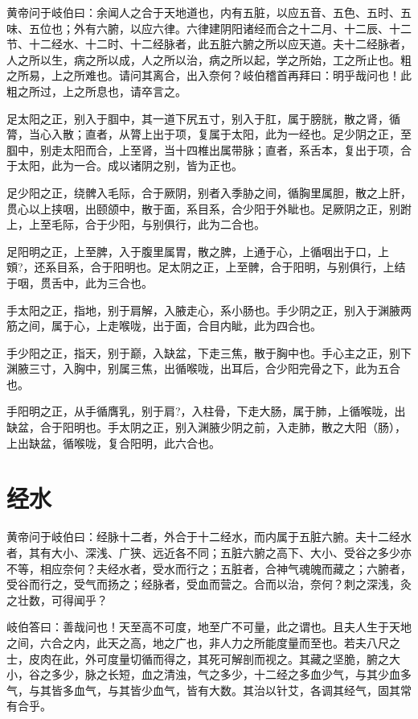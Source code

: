 \documentclass[a4paper,12pt,UTF8,twoside]{ctexbook}
\begin{document}
	黄帝问于岐伯曰：余闻人之合于天地道也，内有五脏，以应五音、五色、五时、五味、五位也；外有六腑，以应六律。六律建阴阳诸经而合之十二月、十二辰、十二节、十二经水、十二时、十二经脉者，此五脏六腑之所以应天道。夫十二经脉者，人之所以生，病之所以成，人之所以治，病之所以起，学之所始，工之所止也。粗之所易，上之所难也。请问其离合，出入奈何？岐伯稽首再拜曰：明乎哉问也！此粗之所过，上之所息也，请卒言之。
	
	足太阳之正，别入于腘中，其一道下尻五寸，别入于肛，属于膀胱，散之肾，循膂，当心入散；直者，从膂上出于项，复属于太阳，此为一经也。足少阴之正，至腘中，别走太阳而合，上至肾，当十四椎出属带脉；直者，系舌本，复出于项，合于太阳，此为一合。成以诸阴之别，皆为正也。
	
	足少阳之正，绕髀入毛际，合于厥阴，别者入季胁之间，循胸里属胆，散之上肝，贯心以上挟咽，出颐颌中，散于面，系目系，合少阳于外眦也。足厥阴之正，别跗上，上至毛际，合于少阳，与别俱行，此为二合也。
	
	足阳明之正，上至脾，入于腹里属胃，散之脾，上通于心，上循咽出于口，上頞?，还系目系，合于阳明也。足太阴之正，上至髀，合于阳明，与别俱行，上结于咽，贯舌中，此为三合也。
	
	手太阳之正，指地，别于肩解，入腋走心，系小肠也。手少阴之正，别入于渊腋两筋之间，属于心，上走喉咙，出于面，合目内眦，此为四合也。
	
	手少阳之正，指天，别于巅，入缺盆，下走三焦，散于胸中也。手心主之正，别下渊腋三寸，入胸中，别属三焦，出循喉咙，出耳后，合少阳完骨之下，此为五合也。
	
	手阳明之正，从手循膺乳，别于肩?，入柱骨，下走大肠，属于肺，上循喉咙，出缺盆，合于阳明也。手太阴之正，别入渊腋少阴之前，入走肺，散之大阳（肠），上出缺盆，循喉咙，复合阳明，此六合也。
	\chapter{经水}
	
	黄帝问于岐伯曰：经脉十二者，外合于十二经水，而内属于五脏六腑。夫十二经水者，其有大小、深浅、广狭、远近各不同；五脏六腑之高下、大小、受谷之多少亦不等，相应奈何？夫经水者，受水而行之；五脏者，合神气魂魄而藏之；六腑者，受谷而行之，受气而扬之；经脉者，受血而营之。合而以治，奈何？刺之深浅，灸之壮数，可得闻乎？
	
	岐伯答曰：善哉问也！天至高不可度，地至广不可量，此之谓也。且夫人生于天地之间，六合之内，此天之高，地之广也，非人力之所能度量而至也。若夫八尺之士，皮肉在此，外可度量切循而得之，其死可解剖而视之。其藏之坚脆，腑之大小，谷之多少，脉之长短，血之清浊，气之多少，十二经之多血少气，与其少血多气，与其皆多血气，与其皆少血气，皆有大数。其治以针艾，各调其经气，固其常有合乎。
	
\end{document}
